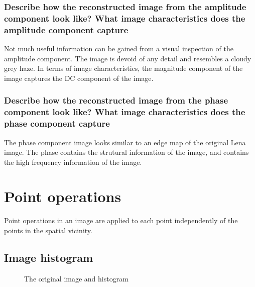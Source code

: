 \documentclass[article, 1.5space, letterpaper, 12pt, oneside, header, footer]{SydeClass}
\begin{document}
\subsubsection{Describe how the reconstructed image from the amplitude component look like? What image characteristics does the amplitude component capture}
Not much useful information can be gained from a visual inspection of the amplitude component. The image is devoid of any detail and resembles a cloudy grey haze. In terms of image characteristics, the magnitude component of the image captures the DC component of the image.


\subsubsection{Describe how the reconstructed image from the phase component look like? What image characteristics does the phase component capture}
The phase component image looks similar to an edge map of the original Lena image. The phase contains the strutural information of the image, and contains the high frequency information of the image.


\section{Point operations}

Point operations in an image are applied to each point independently of the points in the spatial vicinity.

\subsection{Image histogram}

\begin{figure}[ht]
\centering
	\caption{The original image and histogram}
	\label{fig:hist-original}
\end{figure}
\end{document}
